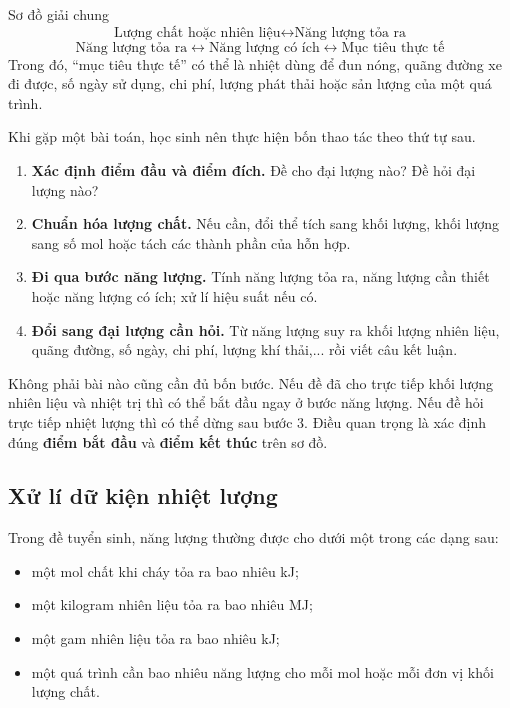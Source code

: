 \begin{ghinho}{Sơ đồ giải chung}
\[
\boxed{\text{Lượng chất hoặc nhiên liệu}}
\longleftrightarrow
\boxed{\text{Năng lượng tỏa ra}}
\]
\[
\boxed{\text{Năng lượng tỏa ra}}
\longleftrightarrow
\boxed{\text{Năng lượng có ích}}
\longleftrightarrow
\boxed{\text{Mục tiêu thực tế}}
\]
Trong đó, ``mục tiêu thực tế'' có thể là nhiệt dùng để đun nóng, quãng đường xe đi được, số ngày sử dụng, chi phí, lượng  phát thải hoặc sản lượng của một quá trình.
\end{ghinho}

Khi gặp một bài toán, học sinh nên thực hiện bốn thao tác theo thứ tự sau.

\begin{enumerate}
\item \textbf{Xác định điểm đầu và điểm đích.} Đề cho đại lượng nào? Đề hỏi đại lượng nào?
\item \textbf{Chuẩn hóa lượng chất.} Nếu cần, đổi thể tích sang khối lượng, khối lượng sang số mol hoặc tách các thành phần của hỗn hợp.
\item \textbf{Đi qua bước năng lượng.} Tính năng lượng tỏa ra, năng lượng cần thiết hoặc năng lượng có ích; xử lí hiệu suất nếu có.
\item \textbf{Đổi sang đại lượng cần hỏi.} Từ năng lượng suy ra khối lượng nhiên liệu, quãng đường, số ngày, chi phí, lượng khí thải,... rồi viết câu kết luận.
\end{enumerate}

\begin{notechem}
Không phải bài nào cũng cần đủ bốn bước. Nếu đề đã cho trực tiếp khối lượng nhiên liệu và nhiệt trị thì có thể bắt đầu ngay ở bước năng lượng. Nếu đề hỏi trực tiếp nhiệt lượng thì có thể dừng sau bước 3. Điều quan trọng là xác định đúng \textbf{điểm bắt đầu} và \textbf{điểm kết thúc} trên sơ đồ.
\end{notechem}

\subsection{Xử lí dữ kiện nhiệt lượng}

Trong đề tuyển sinh, năng lượng thường được cho dưới một trong các dạng sau:
\begin{itemize}
\item một mol chất khi cháy tỏa ra bao nhiêu \si{\kilo\joule};
\item một kilogram nhiên liệu tỏa ra bao nhiêu \si{\mega\joule};
\item một gam nhiên liệu tỏa ra bao nhiêu \si{\kilo\joule};
\item một quá trình cần bao nhiêu năng lượng cho mỗi mol hoặc mỗi đơn vị khối lượng chất.
\end{itemize}


